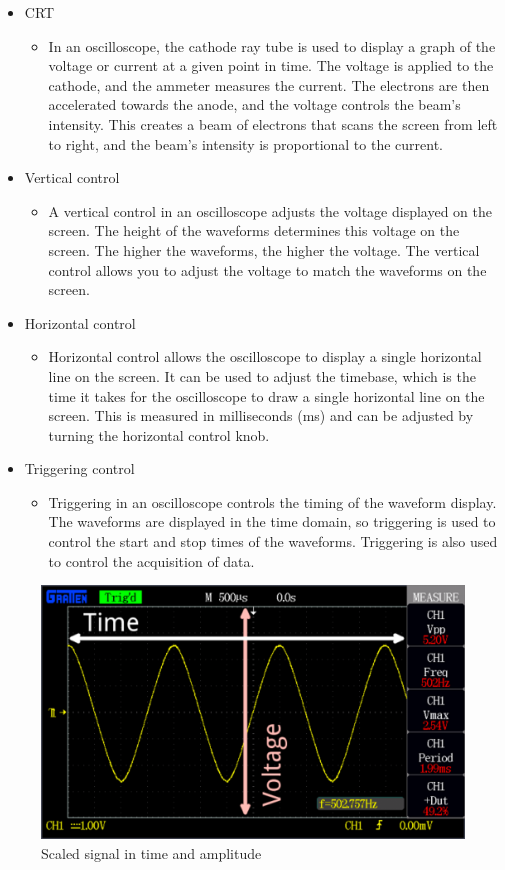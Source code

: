 \begin{itemize}
	\item CRT
	\begin{itemize}
		\item In an oscilloscope, the cathode ray tube is used to display a graph of the voltage or current at a given point in time. The voltage is applied to the cathode, and the ammeter measures the current. The electrons are then accelerated towards the anode, and the voltage controls the beam’s intensity. This creates a beam of electrons that scans the screen from left to right, and the beam’s intensity is proportional to the current.
	\end{itemize}
	\item Vertical control
	\begin{itemize}
		\item A vertical control in an oscilloscope adjusts the voltage displayed on the screen. The height of the waveforms determines this voltage on the screen. The higher the waveforms, the higher the voltage. The vertical control allows you to adjust the voltage to match the waveforms on the screen.
	\end{itemize}
	\item Horizontal control
	\begin{itemize}
		\item Horizontal control allows the oscilloscope to display a single horizontal line on the screen. It can be used to adjust the timebase, which is the time it takes for the oscilloscope to draw a single horizontal line on the screen. This is measured in milliseconds (ms) and can be adjusted by turning the horizontal control knob.
	\end{itemize}
	\item Triggering control
	\begin{itemize}
		\item Triggering in an oscilloscope controls the timing of the waveform display. The waveforms are displayed in the time domain, so triggering is used to control the start and stop times of the waveforms. Triggering is also used to control the acquisition of data.
	\end{itemize}
\end{itemize}

\begin{figure}[H]
	\centering
	\includegraphics[width=12cm]{images/img.png}
	\caption{Scaled signal in time and amplitude}
	\label{fig:dunno}
\end{figure}

